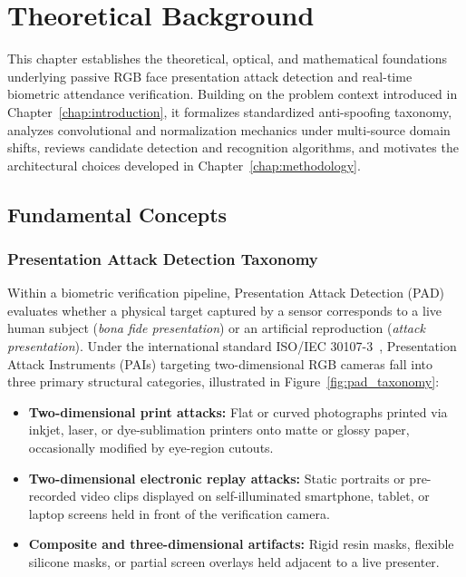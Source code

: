 \chapter{Theoretical Background}
\label{chap:theoretical_background}

This chapter establishes the theoretical, optical, and mathematical foundations underlying passive RGB face presentation attack detection and real-time biometric attendance verification. Building on the problem context introduced in Chapter~\ref{chap:introduction}, it formalizes standardized anti-spoofing taxonomy, analyzes convolutional and normalization mechanics under multi-source domain shifts, reviews candidate detection and recognition algorithms, and motivates the architectural choices developed in Chapter~\ref{chap:methodology}.

\section{Fundamental Concepts}
\label{sec:fundamental_concepts}

\subsection{Presentation Attack Detection Taxonomy}

Within a biometric verification pipeline, Presentation Attack Detection (PAD) evaluates whether a physical target captured by a sensor corresponds to a live human subject (\emph{bona fide presentation}) or an artificial reproduction (\emph{attack presentation}). Under the international standard ISO/IEC 30107-3~\cite{iso30107_3}, Presentation Attack Instruments (PAIs) targeting two-dimensional RGB cameras fall into three primary structural categories, illustrated in Figure~\ref{fig:pad_taxonomy}:
\begin{itemize}
    \item \textbf{Two-dimensional print attacks:} Flat or curved photographs printed via inkjet, laser, or dye-sublimation printers onto matte or glossy paper, occasionally modified by eye-region cutouts.
    \item \textbf{Two-dimensional electronic replay attacks:} Static portraits or pre-recorded video clips displayed on self-illuminated smartphone, tablet, or laptop screens held in front of the verification camera.
    \item \textbf{Composite and three-dimensional artifacts:} Rigid resin masks, flexible silicone masks, or partial screen overlays held adjacent to a live presenter.
\end{itemize}

